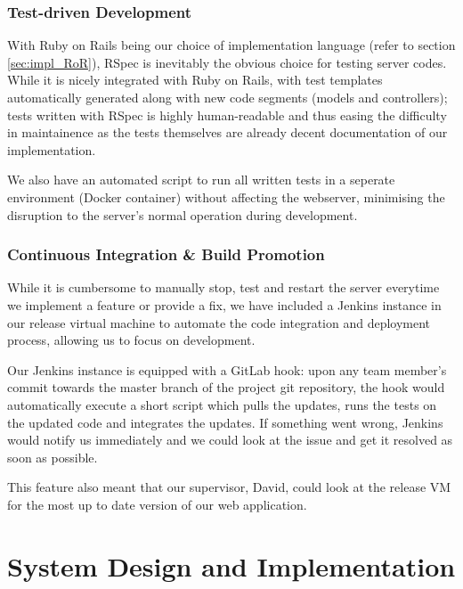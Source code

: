 \documentclass[a4paper, titlepage]{article}
\begin{document}
\subsubsection{Test-driven Development} \label{sec:projman_tdd}
With Ruby on Rails being our choice of implementation language (refer to section \ref{sec:impl_RoR}),
RSpec is inevitably the obvious choice for testing server codes.
While it is nicely integrated with Ruby on Rails, with test templates automatically
generated along with new code segments (models and controllers);
tests written with RSpec is highly human-readable and thus
easing the difficulty in maintainence as the tests themselves are already
decent documentation of our implementation.

We also have an automated script to run all written tests in a seperate
environment (Docker container) without affecting the webserver, minimising
the disruption to the server's normal operation during development.



\subsubsection{Continuous Integration \& Build Promotion}

While it is cumbersome to manually stop, test and restart the server
everytime we implement a feature or provide a fix, we have
included a Jenkins instance in our release virtual machine to automate
the code integration and deployment process, allowing us to focus on
development.

Our Jenkins instance is equipped with a GitLab hook: upon any team member's
commit towards the master branch of the project git repository, the hook would
automatically execute a short script which pulls the updates, runs the tests
on the updated code and integrates the updates. If something went wrong,
Jenkins would notify us immediately and we could look at the issue and get
it resolved as soon as possible.

This feature also meant that our supervisor, David, could look at the release VM 
for the most up to date version of our web application. 

\newpage
\section{System Design and Implementation}
\end{document}
